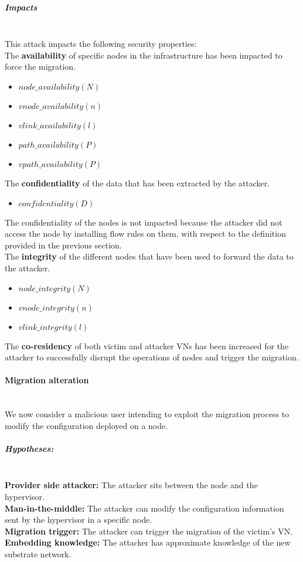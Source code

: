 \subparagraph{Impacts}\textbf{\\}
This attack impacts the following security properties:\\
The \textbf{availability} of specific nodes in the infrastructure has been impacted to force the migration.
\begin{itemize}
    \item $node\_availability(N)$
    \item $vnode\_availability(n)$
    \item $vlink\_availability(l)$
    \item $path\_availability(P)$
    \item $vpath\_availability(P)$
\end{itemize}
The \textbf{confidentiality} of the data that has been extracted by the attacker.
\begin{itemize}
    \item $confidentiality(D)$
\end{itemize}
The confidentiality of the nodes is not impacted because the attacker did not access the node by installing flow rules on them, with respect to the definition provided in the previous section.\\
The \textbf{integrity} of the different nodes that have been used to forward the data to the attacker.
    \begin{itemize}
    \item $node\_integrity(N)$
    \item $vnode\_integrity(n)$
    \item $vlink\_integrity(l)$
\end{itemize}
The \textbf{co-residency} of both victim and attacker VNs has been increased for the attacker to successfully disrupt the operations of nodes and trigger the migration.


\paragraph{Migration alteration}\textbf{\\}
We now consider a malicious user intending to exploit the migration process to modify the configuration deployed on a node.

\subparagraph{Hypotheses:}\textbf{\\}
\textbf{Provider side attacker:} The attacker sits between the node and the hypervisor.\\
\textbf{Man-in-the-middle:} The attacker can modify the configuration information sent by the hypervisor in a specific node.\\
\textbf{Migration trigger:} The attacker can trigger the migration of the victim's VN.\\
\textbf{Embedding knowledge:} The attacker has approximate knowledge of the new substrate network.

